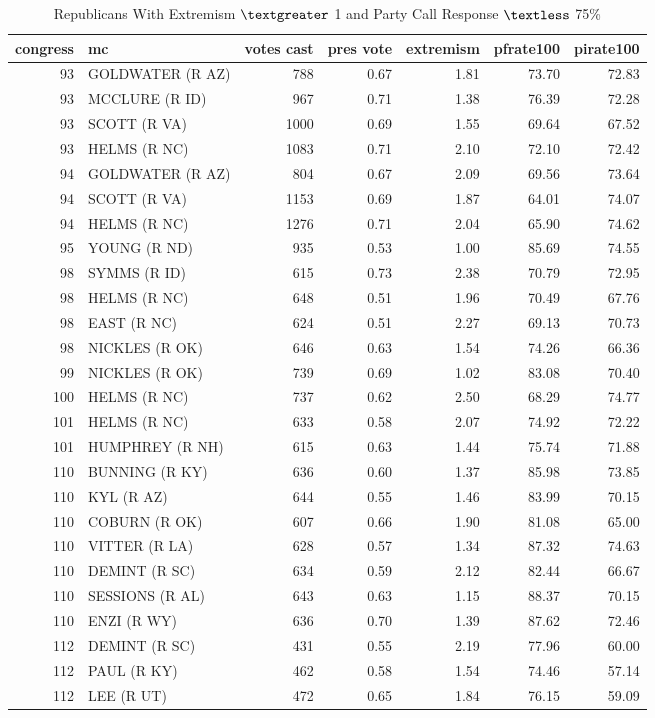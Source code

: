 \documentclass[12pt]{article}
\begin{document}
\begin{table}[ht]
	\centering
	\caption{Republicans With Extremism $ \textgreater $ 1 and Party Call Response $ \textless $ 75\%}
	\begin{tabular}{rlrrrrr}
		\hline
		congress & mc & votes cast & pres vote & extremism & pfrate100 & pirate100 \\ 
		\hline
		93 & GOLDWATER (R AZ) & 788 & 0.67 & 1.81 & 73.70 & 72.83 \\ 
		93 & MCCLURE (R ID) & 967 & 0.71 & 1.38 & 76.39 & 72.28 \\ 
		93 & SCOTT (R VA) & 1000 & 0.69 & 1.55 & 69.64 & 67.52 \\ 
		93 & HELMS (R NC) & 1083 & 0.71 & 2.10 & 72.10 & 72.42 \\ 
		94 & GOLDWATER (R AZ) & 804 & 0.67 & 2.09 & 69.56 & 73.64 \\ 
		94 & SCOTT (R VA) & 1153 & 0.69 & 1.87 & 64.01 & 74.07 \\ 
		94 & HELMS (R NC) & 1276 & 0.71 & 2.04 & 65.90 & 74.62 \\ 
		95 & YOUNG (R ND) & 935 & 0.53 & 1.00 & 85.69 & 74.55 \\ 
		98 & SYMMS (R ID) & 615 & 0.73 & 2.38 & 70.79 & 72.95 \\ 
		98 & HELMS (R NC) & 648 & 0.51 & 1.96 & 70.49 & 67.76 \\ 
		98 & EAST (R NC) & 624 & 0.51 & 2.27 & 69.13 & 70.73 \\ 
		98 & NICKLES (R OK) & 646 & 0.63 & 1.54 & 74.26 & 66.36 \\ 
		99 & NICKLES (R OK) & 739 & 0.69 & 1.02 & 83.08 & 70.40 \\ 
		100 & HELMS (R NC) & 737 & 0.62 & 2.50 & 68.29 & 74.77 \\ 
		101 & HELMS (R NC) & 633 & 0.58 & 2.07 & 74.92 & 72.22 \\ 
		101 & HUMPHREY (R NH) & 615 & 0.63 & 1.44 & 75.74 & 71.88 \\ 
		110 & BUNNING (R KY) & 636 & 0.60 & 1.37 & 85.98 & 73.85 \\ 
		110 & KYL (R AZ) & 644 & 0.55 & 1.46 & 83.99 & 70.15 \\ 
		110 & COBURN (R OK) & 607 & 0.66 & 1.90 & 81.08 & 65.00 \\ 
		110 & VITTER (R LA) & 628 & 0.57 & 1.34 & 87.32 & 74.63 \\ 
		110 & DEMINT (R SC) & 634 & 0.59 & 2.12 & 82.44 & 66.67 \\ 
		110 & SESSIONS (R AL) & 643 & 0.63 & 1.15 & 88.37 & 70.15 \\ 
		110 & ENZI (R WY) & 636 & 0.70 & 1.39 & 87.62 & 72.46 \\ 
		112 & DEMINT (R SC) & 431 & 0.55 & 2.19 & 77.96 & 60.00 \\ 
		112 & PAUL (R KY) & 462 & 0.58 & 1.54 & 74.46 & 57.14 \\ 
		112 & LEE (R UT) & 472 & 0.65 & 1.84 & 76.15 & 59.09 \\ 
		\hline
	\end{tabular}
\end{table}
\end{document}
